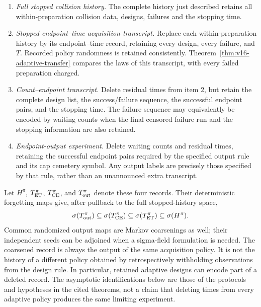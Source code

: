 \begin{enumerate}
\item \emph{Full stopped collision history.}  The complete history just
described retains all within-preparation collision data, designs, failures
and the stopping time.

\item \emph{Stopped endpoint--time acquisition transcript.}  Replace each
within-preparation history by its endpoint--time record, retaining every
design, every failure, and \(T\).  Recorded policy randomness is retained
consistently.  Theorem~\ref{thm:v16-adaptive-transfer} compares the laws of
this transcript, with every failed preparation charged.

\item \emph{Count--endpoint transcript.}  Delete residual times from item 2,
but retain the complete design list, the success/failure sequence, the
successful endpoint pairs, and the stopping time.  The failure sequence may
equivalently be encoded by waiting counts when the final censored failure
run and the stopping information are also retained.

\item \emph{Endpoint-output experiment.}  Delete waiting counts and residual
times, retaining the successful endpoint pairs required by the specified
output rule and its cap cemetery symbol.  Any output labels are precisely
those specified by that rule, rather than an unannounced extra transcript.
\end{enumerate}

Let \(H^\pi\), \(T_{\rm ET}^\pi\), \(T_{\rm CE}^\pi\), and
\(T_{\rm out}^\pi\) denote these four records.  Their deterministic
forgetting maps give, after pullback to the full stopped-history space,
\begin{equation}\label{eq:v29-stopped-hierarchy}
 \sigma(T_{\rm out}^\pi)\subseteq\sigma(T_{\rm CE}^\pi)
       \subseteq\sigma(T_{\rm ET}^\pi)\subseteq\sigma(H^\pi).
\end{equation}
Common randomized output maps are Markov coarsenings as well; their
independent seeds can be adjoined when a sigma-field formulation is needed.
The coarsened record is always the output of the same acquisition policy.
It is not the history of a different policy obtained by retrospectively
withholding observations from the design rule.  In particular, retained
adaptive designs can encode part of a deleted record.  The asymptotic
identifications below are those of the protocols and hypotheses in the cited
theorems, not a claim that deleting times from every adaptive policy produces
the same limiting experiment.

